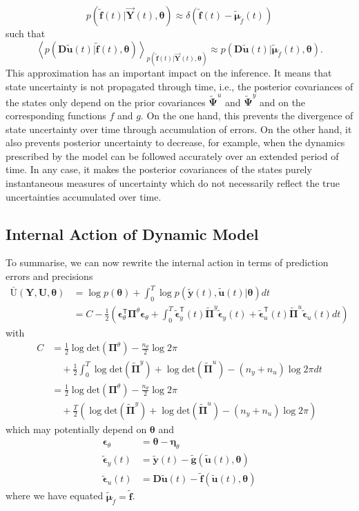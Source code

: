 \documentclass[a4paper,10pt]{article}
\newcommand{\bs}[1]{\mathbf{#1}}					%
\newcommand{\bgs}[1]{\boldsymbol{#1}}				%
\newcommand{\tr}{\mathsf{T}}				%
\newcommand{\eq}[1]{\begin{equation} #1 \end{equation}}%
\newcommand{\gc}[1]{\tilde{#1}} %
\renewcommand{\ss}{u}         %
\newcommand{\so}{y}         %
\newcommand{\spe}{\epsilon} %
\renewcommand{\sp}{\theta}    %
\newcommand{\ps}{\bs{\ss}}    %
\newcommand{\po}{\bs{\so}}    %
\newcommand{\ppe}{\bgs{\spe}} %
\newcommand{\psg}{\gc{\ps}}    %
\newcommand{\pog}{\gc{\po}}    %
\newcommand{\ppeg}{\gc{\ppe}} %
\newcommand{\pp}{\bgs{\sp}} %
\newcommand{\Ps}{\bs{U}}    %
\newcommand{\Po}{\bs{Y}}    %
\newcommand{\D}{\bs{D}}				%
\newcommand{\E}[2][]{\left\langle #2 \right\rangle_{#1}}	%
\newcommand{\Ua}{\bar{\mathrm{U}}}		%
\renewcommand{\det}[1]{\mathrm{det}(#1)}	%
\begin{document}
\eq{
    p(\gc{\bs{f}}(t)|\vec{\Po}(t),\pp) \approx \delta(\gc{\bs{f}}(t) - \gc{\bgs{\mu}}_{\gc{f}}(t))
}
such that
\eq{
    \E[p(\gc{\bs{f}}(t)|\vec{\Po}(t),\pp)]{p(\D\psg(t)|\gc{\bs{f}}(t),\pp)} \approx p(\D\psg(t)|\gc{\bgs{\mu}}_{\gc{f}}(t),\pp).
}
This approximation has an important impact on the inference. It means that state uncertainty is not propagated through time, i.e., the posterior covariances of the states only depend on the prior covariances $\gc{\bgs{\Psi}}^\ss$ and $\gc{\bgs{\Psi}}^\so$ and on the corresponding functions $f$ and $g$. On the one hand, this prevents the divergence of state uncertainty over time through accumulation of errors. On the other hand, it also prevents posterior uncertainty to decrease, for example, when the dynamics prescribed by the model can be followed accurately over an extended period of time. In any case, it makes the posterior covariances of the states purely instantaneous measures of uncertainty which do not necessarily reflect the true uncertainties accumulated over time.


\subsection{Internal Action of Dynamic Model}
To summarise, we can now rewrite the internal action in terms of prediction errors and precisions
\begin{align}
    \Ua(\Po,\Ps,\pp) &= \log p(\pp) + \int_0^T \log p(\pog(t),\psg(t)|\pp)dt\nonumber\\
    &= C - \frac{1}{2}\left(\ppe_\sp^\tr\bgs{\Pi}^{\sp}\ppe_\sp + \int_0^T \ppeg_\so^\tr(t)\gc{\bgs{\Pi}}^{\so}\ppeg_\so(t) + \ppeg_\ss^\tr(t)\gc{\bgs{\Pi}}^{\ss}\ppeg_\ss(t)  dt\right)
\end{align}
with 
\begin{align}
    C &= \frac{1}{2}\log\det{\bgs{\Pi}^{\sp}} - \frac{n_\sp}{2}\log 2\pi\nonumber\\
    &\quad + \frac{1}{2} \int_0^T \log\det{\gc{\bgs{\Pi}}^{\so}} + \log\det{\gc{\bgs{\Pi}}^{\ss}} - (n_\so + n_\ss)\log 2\pi dt\\
    &= \frac{1}{2}\log\det{\bgs{\Pi}^{\sp}} - \frac{n_\sp}{2}\log 2\pi\nonumber\\
    &\quad + \frac{T}{2} \left( \log\det{\gc{\bgs{\Pi}}^{\so}} + \log\det{\gc{\bgs{\Pi}}^{\ss}} - (n_\so + n_\ss)\log 2\pi \right)
\end{align}
which may potentially depend on $\pp$ and
\begin{align}
    \ppe_\sp &= \pp - \bgs{\eta}_\sp\\
    \ppeg_\so(t) &= \pog(t) - \gc{\bs{g}}(\psg(t),\pp)\\
    \ppeg_\ss(t) &= \D\psg(t) - \gc{\bs{f}}(\psg(t),\pp)
\end{align}
where we have equated $\gc{\bgs{\mu}}_{\gc{f}}=\gc{\bs{f}}$.
\end{document}
